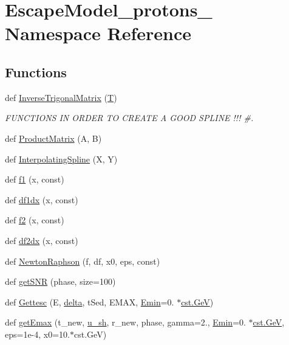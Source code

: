 \hypertarget{namespaceEscapeModel__protons__2}{}\section{Escape\+Model\+\_\+protons\+\_ Namespace Reference}
\label{namespaceEscapeModel__protons__2}
\subsection*{Functions}
\begin{DoxyCompactItemize}
\item 
def \hyperlink{namespaceEscapeModel__protons__2_a9d3379a69c7cfe7ef8d12d0d52b0edd6}{Inverse\+Trigonal\+Matrix} (\hyperlink{cr__source_8h_ac94a6e5794c2d7b59588b14025cfba20}{T})
\begin{DoxyCompactList}\small\item\em F\+U\+N\+C\+T\+I\+O\+NS IN O\+R\+D\+ER TO C\+R\+E\+A\+TE A G\+O\+OD S\+P\+L\+I\+NE !!! \#. \end{DoxyCompactList}\item 
def \hyperlink{namespaceEscapeModel__protons__2_af2c1a57e2b58836b87a7c56cd8b100a9}{Product\+Matrix} (A, B)
\item 
def \hyperlink{namespaceEscapeModel__protons__2_a5364279f193fc63c2f20968bd3322b52}{Interpolating\+Spline} (X, Y)
\item 
def \hyperlink{namespaceEscapeModel__protons__2_a165a26137bf291cb3a220e21a0f48877}{f1} (x, const)
\item 
def \hyperlink{namespaceEscapeModel__protons__2_a3695abc72640f6a458d751cc44acc396}{df1dx} (x, const)
\item 
def \hyperlink{namespaceEscapeModel__protons__2_aa6d6431275aed36f04a8441ba02fb152}{f2} (x, const)
\item 
def \hyperlink{namespaceEscapeModel__protons__2_a8236938c2501dfeddd9271efecae3099}{df2dx} (x, const)
\item 
def \hyperlink{namespaceEscapeModel__protons__2_a66f1688735ed11dbc2dd586615209185}{Newton\+Raphson} (f, df, x0, eps, const)
\item 
def \hyperlink{namespaceEscapeModel__protons__2_acf65596d83b73535f7b6f4934e134f4f}{get\+S\+NR} (phase, size=100)
\item 
def \hyperlink{namespaceEscapeModel__protons__2_ab063f6fe6b6f0c05c29dc04cef8b32be}{Gettesc} (E, \hyperlink{namespaceEscapeModel__protons__2_aabbf8d5f65bd65d369a791f79ea1d587}{delta}, t\+Sed, E\+M\+AX, \hyperlink{constants_8h_a068ac4242a1fc9e4ba016240976d16ae}{Emin}=0. $\ast$\hyperlink{constants_8h_aec0e126d9991db8ad0b26139f5860568}{cst.\+GeV})
\item 
def \hyperlink{namespaceEscapeModel__protons__2_a178d4eb6e1bea7a052df9bc9680f3af4}{get\+Emax} (t\+\_\+new, \hyperlink{cr__source_8h_adfcbd2247443f9569e3cb426495e4693}{u\+\_\+sh}, r\+\_\+new, phase, gamma=2., \hyperlink{constants_8h_a068ac4242a1fc9e4ba016240976d16ae}{Emin}=0. $\ast$\hyperlink{constants_8h_aec0e126d9991db8ad0b26139f5860568}{cst.\+GeV}, eps=1e-\/4, x0=10.$\ast$cst.\+Ge\+V)
\end{DoxyCompactItemize}
